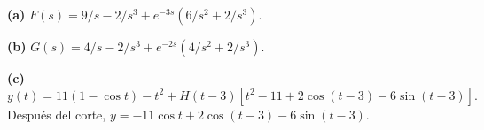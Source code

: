 \noindent\textbf{(a)} $F(s)=9/s-2/s^3+e^{-3s}(6/s^2+2/s^3)$.

\noindent\textbf{(b)} $G(s)=4/s-2/s^3+e^{-2s}(4/s^2+2/s^3)$.

\noindent\textbf{(c)} \[y(t)=11(1-\cos t)-t^2+H(t-3)[t^2-11+2\cos(t-3)-6\sin(t-3)].\]
Después del corte, $y=-11\cos t+2\cos(t-3)-6\sin(t-3)$.
